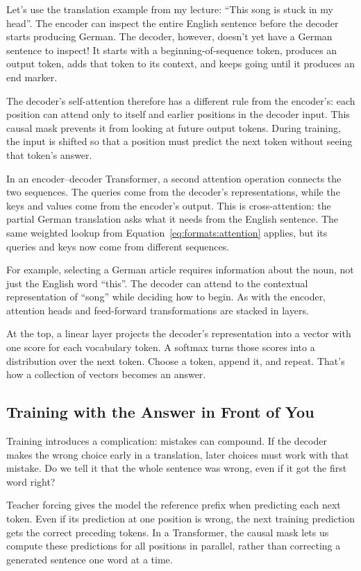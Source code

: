 Let's use the translation example from my lecture: ``This song is stuck in my head''.  The encoder can inspect the entire English sentence before the decoder starts producing German.  The decoder, however, doesn't yet have a German sentence to inspect!  It starts with a beginning-of-sequence token, produces an output token, adds that token to its context, and keeps going until it produces an end marker.

The decoder's self-attention therefore has a different rule from the encoder's: each position can attend only to itself and earlier positions in the decoder input.  This causal mask prevents it from looking at future output tokens.  During training, the input is shifted so that a position must predict the next token without seeing that token's answer.

In an encoder--decoder Transformer, a second attention operation connects the two sequences.  The queries come from the decoder's representations, while the keys and values come from the encoder's output.  This is cross-attention: the partial German translation asks what it needs from the English sentence.  The same weighted lookup from Equation~\ref{eq:formats:attention} applies, but its queries and keys now come from different sequences.

For example, selecting a German article requires information about the noun, not just the English word ``this''.  The decoder can attend to the contextual representation of ``song'' while deciding how to begin.  As with the encoder, attention heads and feed-forward transformations are stacked in layers.

At the top, a linear layer projects the decoder's representation into a vector with one score for each vocabulary token.  A softmax turns those scores into a distribution over the next token.  Choose a token, append it, and repeat.  That's how a collection of vectors becomes an answer.

\subsection{Training with the Answer in Front of You}

Training introduces a complication: mistakes can compound.  If the decoder makes the wrong choice early in a translation, later choices must work with that mistake.  Do we tell it that the whole sentence was wrong, even if it got the first word right?

Teacher forcing gives the model the reference prefix when predicting each next token.  Even if its prediction at one position is wrong, the next training prediction gets the correct preceding tokens.  In a Transformer, the causal mask lets us compute these predictions for all positions in parallel, rather than correcting a generated sentence one word at a time.

